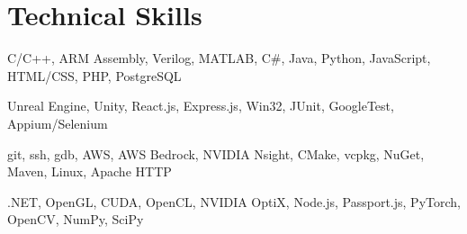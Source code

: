\documentclass[letterpaper,11pt]{article}
\begin{document}
\section{Technical Skills}
    \small{\begin{description}[leftmargin=0.5in, itemindent=-0.25in, labelindent=0.5in, itemsep=-0.2em]
        \item[Languages] C/C++, ARM Assembly, Verilog, MATLAB, C\#, Java, Python, JavaScript, HTML/CSS, PHP, PostgreSQL
        \item[Frameworks] Unreal Engine, Unity, React.js, Express.js, Win32, JUnit, GoogleTest, Appium/Selenium
        \item[Developer tools] git, ssh, gdb, AWS, AWS Bedrock, NVIDIA Nsight, CMake, vcpkg, NuGet, Maven, Linux, Apache HTTP
        \item[Libraries/etc.] .NET, OpenGL, CUDA, OpenCL, NVIDIA OptiX, Node.js, Passport.js, PyTorch, OpenCV, NumPy, SciPy
    \end{description}}

\end{document}

